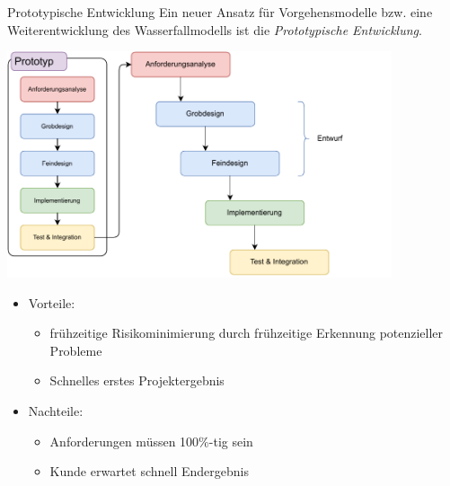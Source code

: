 \begin{defi}{Prototypische Entwicklung}
    Ein neuer Ansatz für Vorgehensmodelle bzw. eine Weiterentwicklung des Wasserfallmodells ist die \emph{Prototypische Entwicklung}.

    \begin{center}
        \includegraphics[width=0.85\textwidth]{includes/figures/defi_prototype_development.pdf}
    \end{center}

    \begin{itemize}
        \item Vorteile:
              \begin{itemize}
                  \item frühzeitige Risikominimierung durch frühzeitige Erkennung potenzieller Probleme
                  \item Schnelles erstes Projektergebnis
              \end{itemize}
        \item Nachteile:
              \begin{itemize}
                  \item Anforderungen müssen 100\%-tig sein
                  \item Kunde erwartet schnell Endergebnis
              \end{itemize}
    \end{itemize}
\end{defi}

